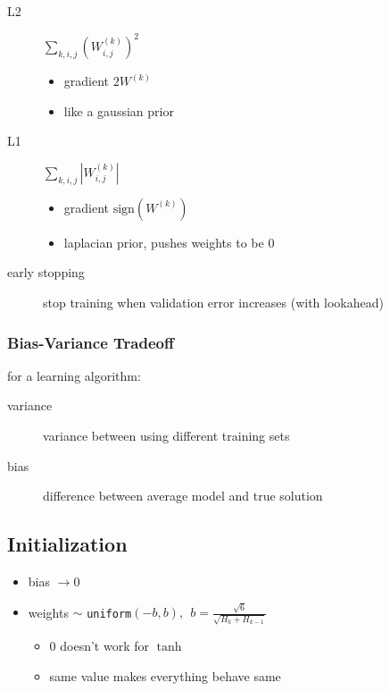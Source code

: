 \documentclass[]{article}
\begin{document}
\begin{description}
    \item[L2] $\sum_{k,i,j} (W_{i,j}^{(k)})^2$
        \begin{itemize}
            \item gradient $2 W^{(k)}$
            \item like a gaussian prior
        \end{itemize}
    \item[L1] $\sum_{k,i,j} | W_{i,j}^{(k)} |$
        \begin{itemize}
            \item gradient $\text{sign}(W^{(k)})$
            \item laplacian prior, pushes weights to be 0
        \end{itemize}
    \item[early stopping] stop training when validation error increases (with lookahead)
\end{description}

\subsubsection{Bias-Variance Tradeoff}%
\label{ssub:bias_variance_tradeoff}

for a learning algorithm:
\begin{description}
    \item[variance] variance between using different training sets
    \item[bias] difference between average model and true solution
\end{description}


\subsection{Initialization}%
\label{sub:initialization}

\begin{itemize}
    \item bias $\to 0$
    \item weights $\sim$ \texttt{uniform}$(-b,b), \ \ b = \frac{\sqrt{6}}{\sqrt{H_k + H_{k-1}}}$
        \begin{itemize}
            \item 0 doesn't work for $\tanh$
            \item same value makes everything behave same
        \end{itemize}
\end{itemize}
\end{document}
